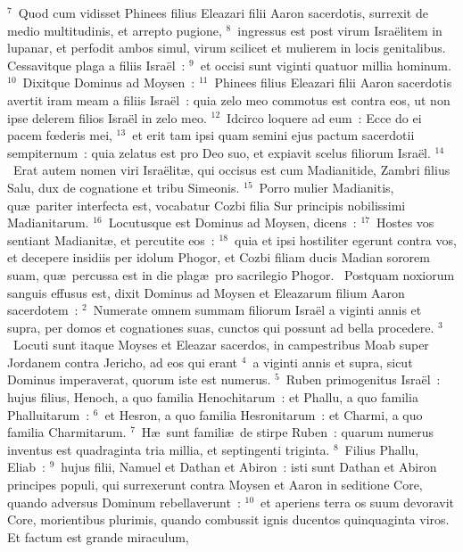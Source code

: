 ${}^{7}$~Quod cum vidisset Phinees filius Eleazari filii Aaron sacerdotis, surrexit de medio multitudinis, et arrepto pugione,
${}^{8}$~ingressus est post virum Isra\"elitem in lupanar, et perfodit ambos simul, virum scilicet et mulierem in locis genitalibus. Cessavitque plaga a filiis Isra\"el~:
${}^{9}$~et occisi sunt viginti quatuor millia hominum.
${}^{10}$~Dixitque Dominus ad Moysen~:
${}^{11}$~Phinees filius Eleazari filii Aaron sacerdotis avertit iram meam a filiis Isra\"el~: quia zelo meo commotus est contra eos, ut non ipse delerem filios Isra\"el in zelo meo.
${}^{12}$~Idcirco loquere ad eum~: Ecce do ei pacem fœderis mei,
${}^{13}$~et erit tam ipsi quam semini ejus pactum sacerdotii sempiternum~: quia zelatus est pro Deo suo, et expiavit scelus filiorum Isra\"el.
${}^{14}$~Erat autem nomen viri Isra\"elit\ae , qui occisus est cum Madianitide, Zambri filius Salu, dux de cognatione et tribu Simeonis.
${}^{15}$~Porro mulier Madianitis, qu\ae\ pariter interfecta est, vocabatur Cozbi filia Sur principis nobilissimi Madianitarum.
${}^{16}$~Locutusque est Dominus ad Moysen, dicens~:
${}^{17}$~Hostes vos sentiant Madianit\ae , et percutite eos~:
${}^{18}$~quia et ipsi hostiliter egerunt contra vos, et decepere insidiis per idolum Phogor, et Cozbi filiam ducis Madian sororem suam, qu\ae\ percussa est in die plag\ae\ pro sacrilegio Phogor.
~\lettrine[lines=10,image=true,loversize=0.05,lraise=-0.03]{P}{}ostquam noxiorum sanguis effusus est, dixit Dominus ad Moysen et Eleazarum filium Aaron sacerdotem~:
${}^{2}$~Numerate omnem summam filiorum Isra\"el a viginti annis et supra, per domos et cognationes suas, cunctos qui possunt ad bella procedere.
${}^{3}$~Locuti sunt itaque Moyses et Eleazar sacerdos, in campestribus Moab super Jordanem contra Jericho, ad eos qui erant
${}^{4}$~a viginti annis et supra, sicut Dominus imperaverat, quorum iste est numerus.
${}^{5}$~Ruben primogenitus Isra\"el~: hujus filius, Henoch, a quo familia Henochitarum~: et Phallu, a quo familia Phalluitarum~:
${}^{6}$~et Hesron, a quo familia Hesronitarum~: et Charmi, a quo familia Charmitarum.
${}^{7}$~H\ae\ sunt famili\ae\ de stirpe Ruben~: quarum numerus inventus est quadraginta tria millia, et septingenti triginta.
${}^{8}$~Filius Phallu, Eliab~:
${}^{9}$~hujus filii, Namuel et Dathan et Abiron~: isti sunt Dathan et Abiron principes populi, qui surrexerunt contra Moysen et Aaron in seditione Core, quando adversus Dominum rebellaverunt~:
${}^{10}$~et aperiens terra os suum devoravit Core, morientibus plurimis, quando combussit ignis ducentos quinquaginta viros. Et factum est grande miraculum,
